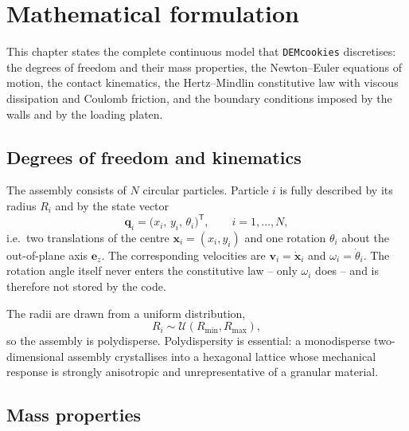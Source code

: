 \chapter{Mathematical formulation}
\label{cha:formulation}

This chapter states the complete continuous model that \texttt{DEMcookies}
discretises: the degrees of freedom and their mass properties, the Newton--Euler
equations of motion, the contact kinematics, the Hertz--Mindlin constitutive law
with viscous dissipation and Coulomb friction, and the boundary conditions
imposed by the walls and by the loading platen.

\section{Degrees of freedom and kinematics}
\label{sec:kinematics}

The assembly consists of $N$ circular particles.  Particle $i$ is fully
described by its radius $R_{i}$ and by the state vector
\begin{equation}
  \mathbf{q}_{i}
  = \bigl(x_{i},\, y_{i},\, \theta_{i}\bigr)^{\mathsf{T}},
  \qquad i = 1,\dots,N,
  \label{eq:dofs}
\end{equation}
i.e.\ two translations of the centre $\mathbf{x}_{i}=(x_{i},y_{i})$ and one
rotation $\theta_{i}$ about the out-of-plane axis $\mathbf{e}_{z}$.  The
corresponding velocities are $\mathbf{v}_{i}=\dot{\mathbf{x}}_{i}$ and
$\omega_{i}=\dot{\theta}_{i}$.  The rotation angle itself never enters the
constitutive law -- only $\omega_{i}$ does -- and is therefore not stored by
the code.

The radii are drawn from a uniform distribution,
\begin{equation}
  R_{i} \sim \mathcal{U}(R_{\min},R_{\max}),
  \label{eq:radii}
\end{equation}
so the assembly is polydisperse.  Polydispersity is essential: a monodisperse
two-dimensional assembly crystallises into a hexagonal lattice whose mechanical
response is strongly anisotropic and unrepresentative of a granular material.

\section{Mass properties}
\label{sec:massprops}

